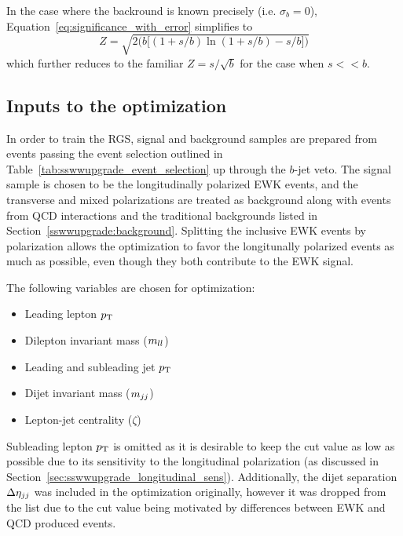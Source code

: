In the case where the backround is known precisely (i.e. $\sigma_b = 0$), Equation~\ref{eq:significance_with_error} simplifies to
\begin{equation}
Z = \sqrt{2\bigg(b\big[(1+s/b)\ln(1+s/b)-s/b\big]\bigg)}
\label{eq:significance_without_error}
\end{equation}
which further reduces to the familiar $Z = s/\sqrt{b}$ for the case when $s << b$.

%
\subsection{Inputs to the optimization}\label{sswwupgrade:opt_inputs}
In order to train the RGS, signal and background samples are prepared from events passing the event selection outlined in Table~\ref{tab:sswwupgrade_event_selection} up through the $b$-jet veto.
The signal sample is chosen to be the longitudinally polarized \ssww EWK events, and the transverse and mixed polarizations are treated as background along with \ssww events from QCD interactions and the traditional backgrounds listed in Section~\ref{sswwupgrade:background}.
Splitting the inclusive \ssww EWK events by polarization allows the optimization to favor the longitunally polarized events as much as possible, even though they both contribute to the EWK signal.

The following variables are chosen for optimization:
\begin{itemize}
\item Leading lepton $p_{\mathrm{T}}$
\item Dilepton invariant mass ($m_{ll}$)
\item Leading and subleading jet $p_{\mathrm{T}}$
\item Dijet invariant mass ($m_{jj}$)
\item Lepton-jet centrality ($\zeta$)
\end{itemize}
Subleading lepton $p_{\mathrm{T}}$ is omitted as it is desirable to keep the cut value as low as possible due to its sensitivity to the longitudinal polarization (as discussed in Section~\ref{sec:sswwupgrade_longitudinal_sens}).
Additionally, the dijet separation $\detajj$ was included in the optimization originally, however it was dropped from the list due to the cut value being motivated by differences between EWK and QCD produced \ssww events.

